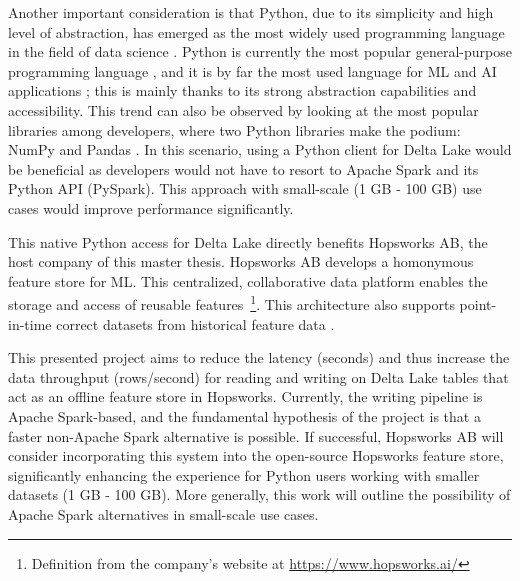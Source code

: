 Another important consideration is that Python, due to its simplicity and high level of abstraction, has emerged as the most widely used programming language in the field of data science \cite{nagpalPythonDataAnalytics2019}. Python is currently the most popular general-purpose programming language \cite{TIOBEIndex, StackOverflowDeveloper}, and it is by far the most used language for \gls{ML} and \gls{AI} applications \cite{python-machine-learning}; this is mainly thanks to its strong abstraction capabilities and accessibility. This trend can also be observed by looking at the most popular libraries among developers, where two Python libraries make the podium: NumPy and Pandas \cite{StackOverflowDeveloper}.
In this scenario, using a Python client for Delta Lake would be beneficial as developers would not have to resort to Apache Spark and its Python \gls{API} (PySpark). This approach with small-scale (1 GB - 100 GB) use cases would improve performance significantly.

This native Python access for Delta Lake directly benefits Hopsworks \gls{AB}, the host company of this master thesis. Hopsworks \gls{AB} develops a homonymous feature store for \gls{ML}. This centralized, collaborative data platform enables the storage and access of reusable features~\footnote{Definition from the company's website at \url{https://www.hopsworks.ai/}}. This architecture also supports point-in-time correct datasets from historical feature data \cite{Pettersson1695672}.

This presented project aims to reduce the latency (seconds) and thus increase the data throughput (rows/second) for reading and writing on Delta Lake tables that act as an offline feature store in Hopsworks. Currently, the writing pipeline is Apache Spark-based, and the fundamental hypothesis of the project is that a faster non-Apache Spark alternative is possible. If successful, Hopsworks AB will consider incorporating this system into the open-source Hopsworks feature store, significantly enhancing the experience for Python users working with smaller datasets (1 GB - 100 GB). More generally, this work will outline the possibility of Apache Spark alternatives in small-scale use cases.